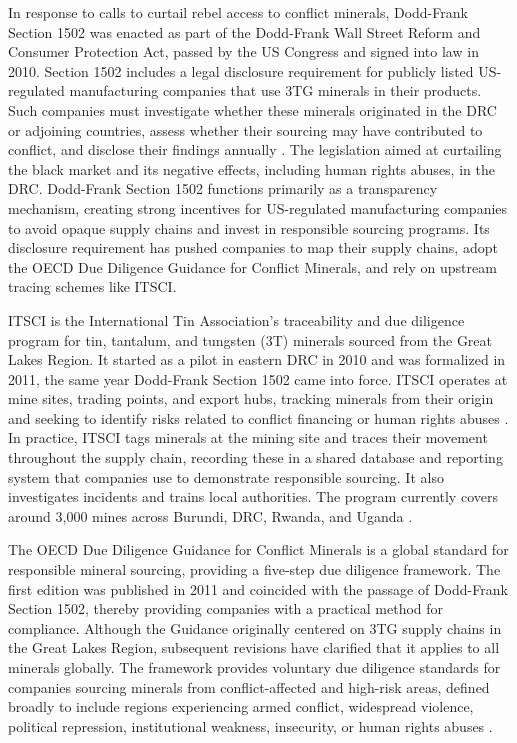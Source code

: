 \documentclass[11pt]{article}
\begin{document}
In response to calls to curtail rebel access to conflict minerals, Dodd-Frank Section 1502 was enacted as part of the Dodd-Frank Wall Street Reform and Consumer Protection Act, passed by the US Congress and signed into law in 2010. Section 1502 includes a legal disclosure requirement for publicly listed US-regulated manufacturing companies that use 3TG minerals in their products. Such companies must investigate whether these minerals originated in the DRC or adjoining countries, assess whether their sourcing may have contributed to conflict, and disclose their findings annually \citep{whitney2015conflict}. The legislation aimed at curtailing the black market and its negative effects, including human rights abuses, in the DRC. Dodd-Frank Section 1502 functions primarily as a transparency mechanism, creating strong incentives for US-regulated manufacturing companies to avoid opaque supply chains and invest in responsible sourcing programs. Its disclosure requirement has pushed companies to map their supply chains, adopt the OECD Due Diligence Guidance for Conflict Minerals, and rely on upstream tracing schemes like ITSCI.

ITSCI is the International Tin Association's traceability and due diligence program for tin, tantalum, and tungsten (3T) minerals sourced from the Great Lakes Region. It started as a pilot in eastern DRC in 2010 and was formalized in 2011, the same year Dodd-Frank Section 1502 came into force. ITSCI operates at mine sites, trading points, and export hubs, tracking minerals from their origin and seeking to identify risks related to conflict financing or human rights abuses \citep{postma2021itsci}. In practice, ITSCI tags minerals at the mining site and traces their movement throughout the supply chain, recording these in a shared database and reporting system that companies use to demonstrate responsible sourcing. It also investigates incidents and trains local authorities. The program currently covers around 3,000 mines across Burundi, DRC, Rwanda, and Uganda \citep{itsci2026}.

The OECD Due Diligence Guidance for Conflict Minerals is a global standard for responsible mineral sourcing, providing a five-step due diligence framework. The first edition was published in 2011 and coincided with the passage of Dodd-Frank Section 1502, thereby providing companies with a practical method for compliance. Although the Guidance originally centered on 3TG supply chains in the Great Lakes Region, subsequent revisions have clarified that it applies to all minerals globally. The framework provides voluntary due diligence standards for companies sourcing minerals from conflict-affected and high-risk areas, defined broadly to include regions experiencing armed conflict, widespread violence, political repression, institutional weakness, insecurity, or human rights abuses \citep{cardona2024due}.
\end{document}
